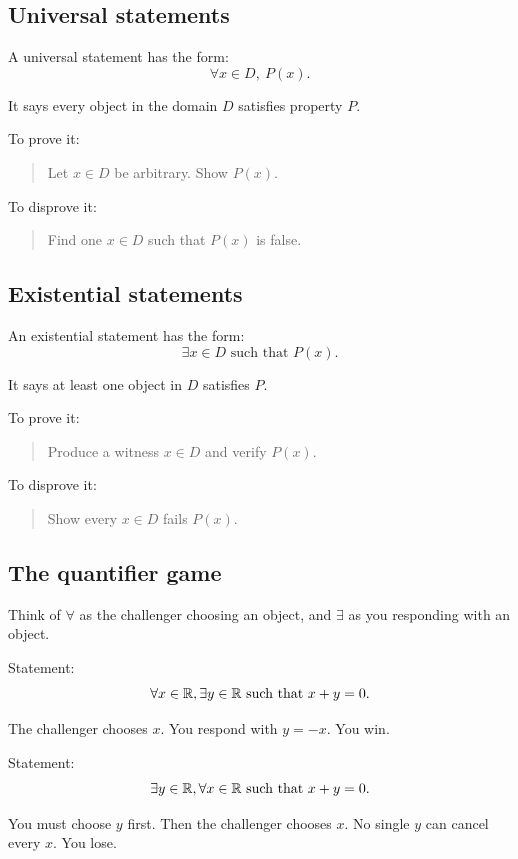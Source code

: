 \documentclass[12pt]{article}
\begin{document}
\subsection{Universal statements}

A universal statement has the form:
\[
\forall x\in D,\ P(x).
\]

It says every object in the domain $D$ satisfies property $P$.

To prove it:

\begin{quote}
Let $x\in D$ be arbitrary. Show $P(x)$.
\end{quote}

To disprove it:

\begin{quote}
Find one $x\in D$ such that $P(x)$ is false.
\end{quote}

\subsection{Existential statements}

An existential statement has the form:
\[
\exists x\in D\text{ such that }P(x).
\]

It says at least one object in $D$ satisfies $P$.

To prove it:

\begin{quote}
Produce a witness $x\in D$ and verify $P(x)$.
\end{quote}

To disprove it:

\begin{quote}
Show every $x\in D$ fails $P(x)$.
\end{quote}

\subsection{The quantifier game}

Think of $\forall$ as the challenger choosing an object, and $\exists$ as you responding with an object.

Statement:
\[
\forall x\in\mathbb{R},\exists y\in\mathbb{R}\text{ such that }x+y=0.
\]

The challenger chooses $x$. You respond with $y=-x$. You win.

Statement:
\[
\exists y\in\mathbb{R},\forall x\in\mathbb{R}\text{ such that }x+y=0.
\]

You must choose $y$ first. Then the challenger chooses $x$. No single $y$ can cancel every $x$. You lose.
\end{document}
